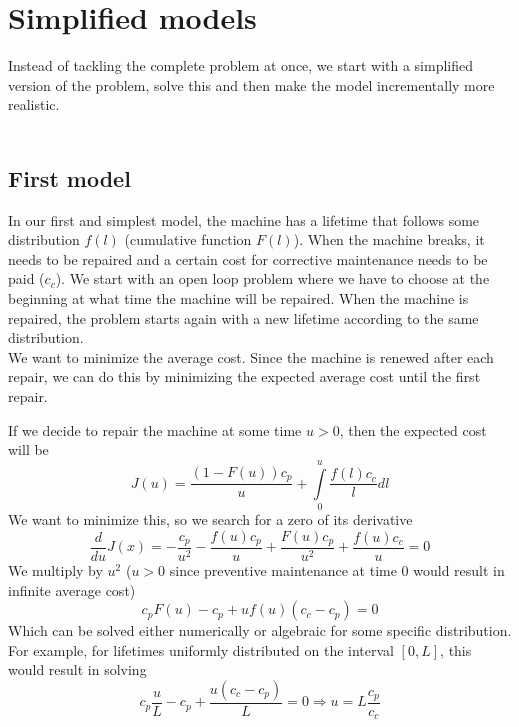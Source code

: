 \section{Simplified models}
Instead of tackling the complete problem at once, we start with a simplified version of the problem, solve this and then make the model incrementally more realistic.\\
\\
\subsection{First model}
In our first and simplest model, the machine has a lifetime that follows some distribution $f(l)$ (cumulative function $F(l)$). When the machine breaks, it needs to be repaired and a certain cost for corrective maintenance needs to be paid ($c_c$). We start with an open loop problem where we have to choose at the beginning at what time the machine will be repaired. 
When the machine is repaired, the problem starts again with a new lifetime according to the same distribution.\\
We want to minimize the average cost. Since the machine is renewed after each repair, we can do this by minimizing the expected average cost until the first repair.

If we decide to repair the machine at some time $u>0$, then the expected cost will be
$$
J(u)=\frac{(1-F(u))c_p}{u}+\int\limits_{0}^u\frac{f(l)c_c}{l}dl
$$
We want to minimize this, so we search for a zero of its derivative
$$
\frac{d}{du}J(x)=-\frac{c_p}{u^2} - \frac{f(u)c_p}{u} +\frac{F(u)c_p}{u^2}+\frac{f(u)c_c}{u}=0
$$
We multiply by $u^2$ ($u>0$ since preventive maintenance at time 0 would result in infinite average cost)
$$
c_pF(u)-c_p+uf(u)(c_c-c_p)=0
$$
Which can be solved either numerically or algebraic for some specific distribution. For example, for lifetimes uniformly distributed on the interval $[0,L]$, this would result in solving
$$
c_p\frac{u}{L}-c_p+\frac{u(c_c-c_p)}{L}=0\Rightarrow u=L\frac{c_p}{c_c}
$$

